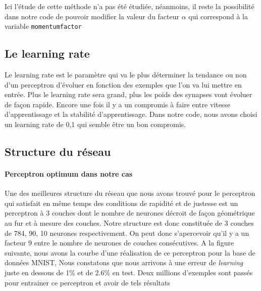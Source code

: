 \documentclass[a4paper,oneside]{report}
\begin{document}
 Ici l'étude de cette méthode n'a pas été étudiée, néanmoins, il reste la possibilité dans notre code de pouvoir modifier la valeur du facteur $\alpha$ qui correspond à la variable \texttt{momentumfactor} 
 
 
 \subsection{Le learning rate}
 Le learning rate est le paramètre qui va le plus déterminer la tendance ou non d'un perceptron d'évoluer en fonction des exemples que l'on va lui mettre en entrée. Plus le learning rate sera grand, plus les poids des 
synapses vont évoluer de façon rapide. Encore une fois il y a un compromis à faire entre vitesse d'apprentissage et la stabilité d'apprentissage. Dans notre code, nous avons choisi un learning rate de 0,1 qui semble être un bon compromis.

\newpage
\subsection{Structure du réseau}

\paragraph{Perceptron optimum dans notre cas}

Une des meilleures structure du réseau que nous avons trouvé pour le perceptron qui satisfait en même temps des conditions de rapidité et de justesse est un perceptron à 3 couches dont le nombre de neurones décroit de façon géométrique au fur et à mesure des couches. Notre structure est donc constituée de 3 couches de 784, 90, 10 neurones respectivement. On peut donc s'apercevoir qu'il y a un facteur 9 entre le nombre de neurones de couches consécutives. A la figure suivante, nous avons la courbe d'une réalisation de ce perceptron pour la base de données MNIST, Nous constatons que nous arrivons à une erreur de \textit{learning} juste en dessous de 1\% et de 2.6\% en test. Deux millions d'exemples sont passés pour entrainer ce perceptron et avoir de tels résultats
\end{document}
